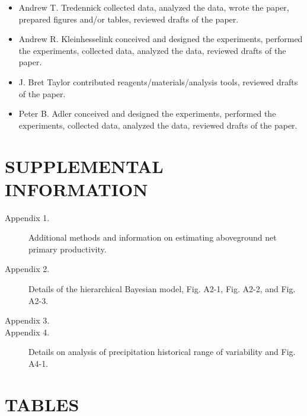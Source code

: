 \documentclass[fleqn,10pt,lineno]{wlpeerj} %
\begin{document}
\begin{itemize}
  \item Andrew T. Tredennick collected data, analyzed the data, wrote the paper, prepared figures and/or tables, reviewed drafts of the paper.
  \item Andrew R. Kleinhesselink conceived and designed the experiments, performed the experiments, collected data, analyzed the data, reviewed drafts of the paper.
  \item J. Bret Taylor contributed reagents/materials/analysis tools, reviewed drafts of the paper.
  \item Peter B. Adler conceived and designed the experiments, performed the experiments, collected data, analyzed the data, reviewed drafts of the paper.
\end{itemize}

\section{SUPPLEMENTAL INFORMATION}\label{supplemental-information}

\begin{description}
\item [Appendix 1.] Additional methods and information on estimating aboveground net primary productivity.
\item [Appendix 2.] Details of the hierarchical Bayesian model, Fig. A2-1, Fig. A2-2, and Fig. A2-3.
\item [Appendix 3.] 
\item [Appendix 4.] Details on analysis of precipitation historical range of variability and Fig. A4-1.
\end{description}

\newpage{}

\section{TABLES}\label{tables}
\end{document}
